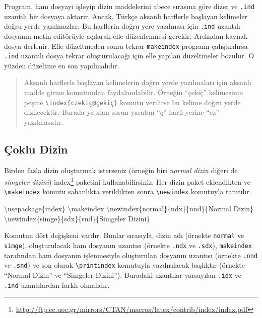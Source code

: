 \documentclass[
  10pt,
]{scrbook}
\newenvironment{Shaded}{\begin{snugshade}}{\end{snugshade}}
\newcommand{\BuiltInTok}[1]{#1}
\newcommand{\ExtensionTok}[1]{#1}
\newcommand{\FunctionTok}[1]{\textcolor[rgb]{0.00,0.00,0.00}{#1}}
\newcommand{\NormalTok}[1]{#1}
\renewcommand{\href}[2]{#2\footnote{\url{#1}}}
\theoremstyle{definition}
\theoremstyle{definition}
\theoremstyle{definition}
\theoremstyle{definition}
\theoremstyle{remark}
\begin{document}
Program, ham dosyayı işleyip dizin maddelerini abece sırasına göre dizer
ve \texttt{.ind} uzantılı bir dosyaya aktarır. Ancak, Türkçe aksanlı harflerle
başlayan kelimeler doğru yerde yazılmazlar. Bu harflerin doğru yere
yazılması için \texttt{.ind} uzantılı dosyanın metin editörüyle açılarak elle
düzenlenmesi gerekir. Ardından kaynak dosya derlenir. Elle düzeltmeden
sonra tekrar \texttt{makeindex} programı çalıştırılırsa \texttt{.ind} uzantılı dosya
tekrar oluşturulacağı için elle yapılan düzeltmeler bozulur. O yüzden
düzeltme en son yapılmalıdır.

\begin{quote}
Aksanlı harflerle başlayan kelimelerin doğru yerde yazılmaları için
aksanlı madde girme komutundan faydalanılabilir. Örneğin ``çekiç''
kelimesinin peşine \texttt{\textbackslash{}index\{czekiç@çekiç\}} komutu verilirse bu kelime
doğru yerde dizilecektir. Burada yapılan sorun yaratan ``ç'' harfi
yerine ``cz'' yazılmasıdır.
\end{quote}

\hypertarget{uxe7oklu-dizin}{%
\subsection{Çoklu Dizin}\label{uxe7oklu-dizin}}

Birden fazla dizin oluşturmak isterseniz (örneğin biri \emph{normal dizin}
diğeri de \emph{simgeler dizini})
\href{http://ftp.cc.uoc.gr/mirrors/CTAN/macros/latex/contrib/index/index.pdf}{index} paketini kullanabilirsiniz. Her dizin paket eklendikten ve \texttt{\textbackslash{}makeindex} komutu sahanlıkta
verildikten sonra \texttt{\textbackslash{}newindex} komutuyla tanıtılır.

\begin{Shaded}
\begin{Highlighting}[]
\BuiltInTok{\textbackslash{}usepackage}\NormalTok{\{}\ExtensionTok{index}\NormalTok{\}}
\FunctionTok{\textbackslash{}makeindex}
\FunctionTok{\textbackslash{}newindex}\NormalTok{\{normal\}\{ndx\}\{nnd\}\{Normal Dizin\}}
\FunctionTok{\textbackslash{}newindex}\NormalTok{\{simge\}\{sdx\}\{snd\}\{Simgeler Dizini\}}
\end{Highlighting}
\end{Shaded}

Komutun dört değişkeni vardır. Bunlar sırasıyla, dizin adı (örnekte
\texttt{normal} ve \texttt{simge}), oluşturulacak ham dosyanın uzantısı (örnekte
\texttt{.ndx} ve \texttt{.sdx}), \texttt{makeindex} tarafından ham dosyanın işlenmesiyle
oluşturulan dosyanın uzantısı (örnekte \texttt{.nnd} ve \texttt{.snd}) ve son olarak
\texttt{\textbackslash{}printindex} komutuyla yazdırılacak başlıktır (örnekte ``Normal Dizin''
ve ``Simgeler Dizini''). Buradaki uzantılar varsayılan \texttt{.idx} ve \texttt{.ind}
uzantılardan farklı olmalıdır.
\end{document}
